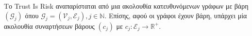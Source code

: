 {}
\begin{definition}[Γράφος]
  Το \textlatin{Trust Is Risk} αναπαρίσταται από μια ακολουθία κατευθυνόμενων γράφων με βάρη $\left(\mathcal{G}_j\right)$ όπου
  $\mathcal{G}_j = \left(\mathcal{V}_j, \mathcal{E}_j\right), j \in \mathbb{N}$. Επίσης, αφού οι γράφοι έχουν βάρη, υπάρχει
  μία ακολουθία συναρτήσεων βάρους $\left(c_j\right)$ με $c_j : \mathcal{E}_j \rightarrow \mathbb{R}^{+}$.

\end{definition}
